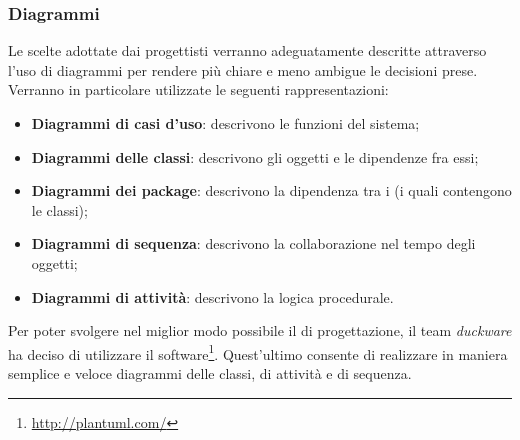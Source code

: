 \subsubsection{Diagrammi}
Le scelte adottate dai progettisti verranno adeguatamente descritte attraverso l’uso di diagrammi  per rendere più chiare e meno ambigue le decisioni prese. Verranno in particolare utilizzate le seguenti rappresentazioni:
\begin{itemize}
	\item \textbf{Diagrammi di casi d’uso}: descrivono le funzioni del sistema;
	\item \textbf{Diagrammi delle classi}: descrivono gli oggetti e le dipendenze fra essi;
	\item \textbf{Diagrammi dei package}: descrivono la dipendenza tra i  (i quali contengono le classi);
	\item \textbf{Diagrammi di sequenza}: descrivono la collaborazione nel tempo degli oggetti;
	\item \textbf{Diagrammi di attività}: descrivono la logica procedurale.
\end{itemize}
Per poter svolgere nel miglior modo possibile il  di progettazione, il team \textit{duckware} ha deciso di utilizzare il software\footnote{\href{http://plantuml.com/}{http://plantuml.com/}}. Quest'ultimo consente di realizzare in maniera semplice e veloce diagrammi delle classi, di attività e di sequenza.
